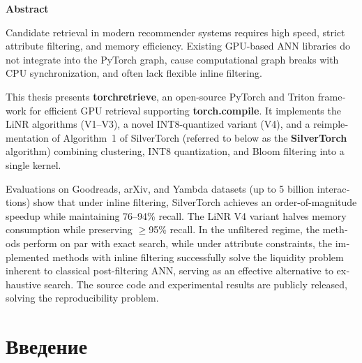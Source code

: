 \documentclass[14pt,a4paper]{extreport}
\numberwithin{figure}{chapter}
\numberwithin{table}{chapter}
\numberwithin{equation}{chapter}
\newcommand{\annotationpage}[2]{
    \clearpage
    \thispagestyle{empty}
    \begin{center}
        \textbf{#1}
    \end{center}

    #2
}
\begin{document}
\annotationpage{\textenglish{Abstract}}{
\begin{english}
Candidate retrieval in modern recommender systems requires high speed, strict attribute filtering, and memory efficiency. Existing GPU-based ANN libraries do not integrate into the PyTorch graph, cause computational graph breaks with CPU synchronization, and often lack flexible inline filtering.

This thesis presents \textbf{torchretrieve}, an open-source PyTorch and Triton framework for efficient GPU retrieval supporting \textbf{torch.compile}. It implements the LiNR algorithms (V1--V3), a novel INT8-quantized variant (V4), and a reimplementation of Algorithm~1 of SilverTorch \cite{xue2025silvertorch} (referred to below as the \textbf{SilverTorch} algorithm) combining clustering, INT8 quantization, and Bloom filtering into a single kernel.

Evaluations on Goodreads, arXiv, and Yambda datasets (up to 5 billion interactions) show that under inline filtering, SilverTorch achieves an order-of-magnitude speedup while maintaining 76--94\% recall. The LiNR V4 variant halves memory consumption while preserving $\ge$95\% recall. In the unfiltered regime, the methods perform on par with exact search, while under attribute constraints, the implemented methods with inline filtering successfully solve the liquidity problem inherent to classical post-filtering ANN, serving as an effective alternative to exhaustive search. The source code and experimental results are publicly released, solving the reproducibility problem.
\end{english}
}

\clearpage
{}

\tableofcontents
\clearpage

\chapter*{Введение}
\end{document}
